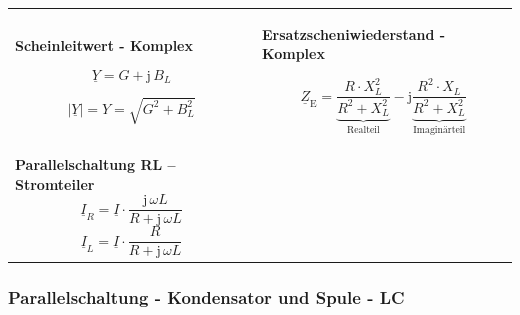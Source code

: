 \documentclass[a4paper,12pt]{article}
\begin{document}
\begin{tabular}{p{} p{}}
		\vspace{5pt}
		\textbf{Scheinleitwert - Komplex}
		
		$$\underline{Y} = G + \mathrm{j}\,B_L$$
		
		$$|\underline{Y}| = Y = \sqrt{G^2 + B_L^2}$$
		
		&
		
		\vspace{5pt}
		\textbf{Ersatzscheniwiederstand - Komplex}
		
		\vspace{0pt}
		$$\underline{Z}_{\mathrm{E}} = \underbrace{\frac{R \cdot X_L^2}{R^2 + X_L^2}}_{\text{Realteil}} - \mathrm{j}\underbrace{\frac{R^2 \cdot X_L}{R^2 + X_L^2}}_{\text{Imaginärteil}}$$
		\\
		
		\textbf{Parallelschaltung RL -- Stromteiler}
		$$\underline{I}_R = \underline{I} \cdot \frac{\mathrm{j}\,\omega L}{R + \mathrm{j}\,\omega L}$$
		$$\underline{I}_L = \underline{I} \cdot \frac{R}{R + \mathrm{j}\,\omega L}$$
		
	\end{tabular}
	
	\subsubsection{Parallelschaltung - Kondensator und Spule - LC}
	
\end{document}
